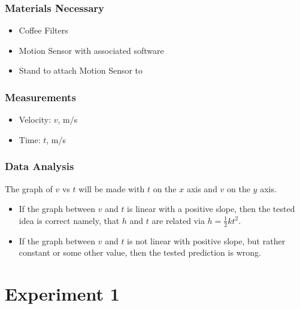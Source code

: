 \documentclass[8pt]{extarticle}
\begin{document}
{\subsubsection*{Materials Necessary}
\begin{itemize}
	\item Coffee Filters
	\item Motion Sensor with associated software
	\item Stand to attach Motion Sensor to
\end{itemize}
\subsubsection*{Measurements}
\begin{itemize}
	\item Velocity: $v$, m/s
	\item Time: $t$, m/s
\end{itemize}
\subsubsection*{Data Analysis}
The graph of $v$ vs $t$ will be made with $t$ on the $x$ axis and $v$ on the $y$ axis.
\begin{itemize}
	\item If the graph between $v$ and $t$ is linear with a positive slope, then the tested idea is correct \textemdash namely, that $h$ and $t$ are related via $h = \frac{1}{2}kt^2$.
	\item If the graph between $v$ and $t$ is not linear with positive slope, but rather constant or some other value, then the tested prediction is wrong.
\end{itemize}
\pagebreak
\section*{Experiment 1}%
}
\end{document}
